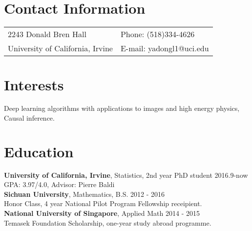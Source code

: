 \documentclass[margin,line]{res}
\begin{document}

\begin{resume}
\section{\sc Contact Information}

\vspace{.05in}
\begin{tabular}{p{3.5in}p{3in}}
2243 Donald Bren Hall & {Phone:}  (518)334-4626\\University of California, Irvine 
& {E-mail:}  yadongl1@uci.edu\\

\end{tabular}


\section{\sc Interests}
  Deep learning algorithms with applications to images and high energy physics, Causal inference.

\section{\sc Education}
{\bf University of California, Irvine}, Statistics, 2nd year PhD student \hfill   2016.9-now \\
GPA: 3.97/4.0, Advisor: Pierre Baldi \\
{\bf Sichuan University}, Mathematics,  B.S. \hfill  2012 - 2016\\
Honor Class, 4 year National Pilot Program Fellowship receipient. \\ 
{\bf National University of Singapore},  Applied Math \hfill   2014 - 2015 \\
Temasek Foundation Scholarship, one-year study abroad programme.
\vspace{2pt}

\end{resume}
\end{document}
